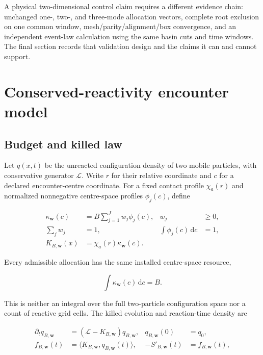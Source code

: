 \documentclass[aps,physrev,reprint,amsmath,amssymb,longbibliography,floatfix]{revtex4-2}
\newcommand{\dd}{\mathrm d}
\begin{document}
A physical two-dimensional control claim requires a different evidence chain:
unchanged one-, two-, and three-mode allocation vectors, complete root
exclusion on one common window, mesh/parity/alignment/box convergence, and an
independent event-law calculation using the same basin cuts and time windows.
The final section records that validation design and the claims it can and
cannot support.

\section{Conserved-reactivity encounter model}
\label{sec:model}

\subsection{Budget and killed law}

Let $q(x,t)$ be the unreacted configuration density of two mobile particles,
with conservative generator $\mathcal L$.  Write $r$ for their relative
coordinate and $c$ for a declared encounter-centre coordinate.  For a fixed
contact profile $\chi_a(r)$ and normalized nonnegative centre-space profiles
$\phi_j(c)$, define

\begin{align}
 \kappa_{\bm w}(c)&=B\sum_{j=1}^{J}w_j\phi_j(c),
 &w_j&\ge0,\nonumber\\
 \sum_jw_j&=1,
 &\int\phi_j(c)\,\dd c&=1,\nonumber\\
 K_{B,\bm w}(x)&=\chi_a(r)\kappa_{\bm w}(c).
 \label{eq:budget-field}
\end{align}

Every admissible allocation has the same installed centre-space resource,

\begin{equation}
 \int\kappa_{\bm w}(c)\,\dd c=B.
 \label{eq:conserved-budget}
\end{equation}

This is neither an integral over the full two-particle configuration space nor
a count of reactive grid cells.  The killed evolution and reaction-time
density are

\begin{align}
 \partial_tq_{B,\bm w}&=(\mathcal L-K_{B,\bm w})q_{B,\bm w},
 &q_{B,\bm w}(0)&=q_0,\nonumber\\
 f_{B,\bm w}(t)&=\langle K_{B,\bm w},q_{B,\bm w}(t)\rangle,
 &-S'_{B,\bm w}(t)&=f_{B,\bm w}(t),
 \label{eq:killed-law}
\end{align}
\end{document}
